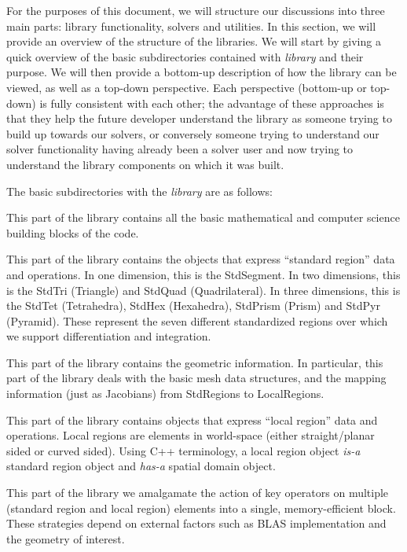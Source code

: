 For the purposes of this document, we will structure our discussions into three main parts:  library functionality, solvers and utilities.  In this
section, we will provide an overview of the structure of the libraries.  We will start by giving a quick overview of the basic subdirectories
contained with {\em library} and their purpose.  We will then provide a bottom-up description of how the library can be viewed, as well
as a top-down perspective.  Each perspective (bottom-up or top-down) is fully consistent with each other; the advantage of these approaches
is that they help the future developer understand the library as someone trying to build up towards our solvers, or conversely someone trying
to understand our solver functionality having already been a solver user and now trying to understand the library components on which it was built.

The basic subdirectories with the {\em library} are as follows:

  This part of the library contains all the basic mathematical and computer science building blocks of the {\nek} code.

 This part of the library contains the objects that express ``standard region'' data and operations.  In one dimension, this is the StdSegment.  In two 
dimensions, this is the StdTri (Triangle) and StdQuad (Quadrilateral).  In three dimensions, this is the StdTet (Tetrahedra), 
StdHex (Hexahedra), StdPrism (Prism) and StdPyr (Pyramid).  These represent the seven different standardized regions over which 
we support differentiation and integration. 

 This part of the library contains the geometric information.  In particular, this part of the library deals with the basic mesh 
data structures, and the mapping information (just as Jacobians) from StdRegions to LocalRegions.

  This part of the library contains objects that express ``local region'' data and operations.  Local regions are \shp elements in
world-space (either straight/planar sided or curved sided).  Using C++ terminology, a local region object {\em is-a} standard region object and {\em has-a} spatial domain object.

 This part of the library we amalgamate the action of key operators on multiple 
(standard region and local region) elements into a single, memory-efficient block. These strategies depend on external
factors such as BLAS implementation and the geometry of interest. 

